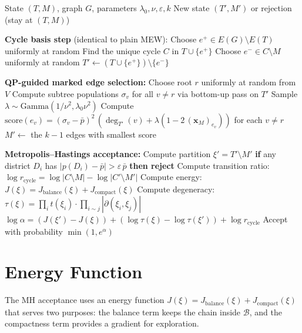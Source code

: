 \documentclass[11pt]{article}
\newcommand{\pbar}{\bar{p}}
\begin{document}
\begin{algorithm}[H]
\caption{QP-Guided MEW Step}
\label{alg:qp-mew}
\begin{algorithmic}[1]
\REQUIRE State $(T, M)$, graph $G$, parameters $\lambda_0, \nu, \varepsilon, k$
\ENSURE New state $(T', M')$ or rejection (stay at $(T, M)$)

\medskip
\STATE \textbf{Cycle basis step} (identical to plain MEW):
\STATE \quad Choose $e^+ \in E(G) \setminus E(T)$ uniformly at random
\STATE \quad Find the unique cycle $C$ in $T \cup \{e^+\}$
\STATE \quad Choose $e^- \in C \setminus M$ uniformly at random
\STATE \quad $T' \leftarrow (T \cup \{e^+\}) \setminus \{e^-\}$

\medskip
\STATE \textbf{QP-guided marked edge selection:}
\STATE \quad Choose root $r$ uniformly at random from $V$
\STATE \quad Compute subtree populations $\sigma_v$ for all $v \neq r$ via bottom-up pass on $T'$
\STATE \quad Sample $\lambda \sim \mathrm{Gamma}(1/\nu^2, \lambda_0 \nu^2)$
\STATE \quad Compute $\mathrm{score}(e_v) = (\sigma_v - \pbar)^2\,(\deg_{T'}(v) + \lambda(1 - 2\,(\mathbf{x}_M)_{e_v}))$ for each $v \neq r$
\STATE \quad $M' \leftarrow$ the $k-1$ edges with smallest score

\medskip
\STATE \textbf{Metropolis--Hastings acceptance:}
\STATE \quad Compute partition $\xi' = T' \setminus M'$
\STATE \quad \textbf{if} any district $D_i$ has $|p(D_i) - \pbar| > \varepsilon\, \pbar$ \textbf{then reject}
\STATE \quad Compute transition ratio: $\log r_{\mathrm{cycle}} = \log|C \setminus M| - \log|C' \setminus M'|$
\STATE \quad Compute energy: $J(\xi) = J_{\mathrm{balance}}(\xi) + J_{\mathrm{compact}}(\xi)$
\STATE \quad Compute degeneracy: $\tau(\xi) = \prod_i t(\xi_i) \cdot \prod_{i \sim j} |\partial(\xi_i, \xi_j)|$
\STATE \quad $\log \alpha = (J(\xi') - J(\xi)) + (\log \tau(\xi) - \log \tau(\xi')) + \log r_{\mathrm{cycle}}$
\STATE \quad Accept with probability $\min(1, e^{\alpha})$
\end{algorithmic}
\end{algorithm}


\section{Energy Function}\label{sec:energy}

The MH acceptance uses an energy function $J(\xi) = J_{\mathrm{balance}}(\xi) + J_{\mathrm{compact}}(\xi)$ that serves two purposes: the balance term keeps the chain inside $\mathcal{B}$, and the compactness term provides a gradient for exploration.
\end{document}
